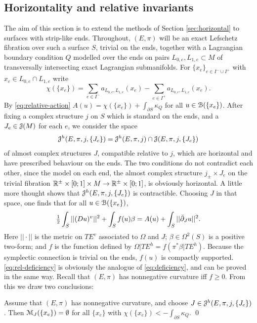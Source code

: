 \documentclass[10pt,letterpaper]{article}
\begin{document}
%

\subsection{Horizontality and relative invariants\label{sec:horizontal-two}}

The aim of this section is to extend the methods of Section
\ref{sec:horizontal} to surfaces with strip-like ends. Throughout, $(E,\pi)$
will be an exact Lefschetz fibration over such a surface $S$, trivial on the
ends, together with a Lagrangian boundary condition $Q$ modelled over the ends
on pairs $L_{0,e},L_{1,e} \subset M$ of transversally intersecting exact
Lagrangian submanifolds. For $\{x_e\}_{e \in I^- \cup I^+}$ with $x_e \in
L_{0,e} \cap L_{1,e}$ write
\[
\chi(\{x_e\}) = \sum_{e \in I^-} a_{L_{0,e},L_{1,e}}(x_e) - \sum_{e \in I^+}
a_{L_{0,e},L_{1,e}}(x_e).
\]
By \eqref{eq:relative-action} $A(u) = \chi(\{x_e\}) + \int_{\partial S}
\kappa_Q$ for all $u \in \mathcal{B}(\{x_e\})$. After fixing a complex structure $j$ on
$S$ which is standard on the ends, and a $J_e \in \mathcal{J}(M)$ for each $e$, we
consider the space
\[
\mathcal{J}^h(E,\pi,j,\{J_e\}) = \mathcal{J}^h(E,\pi,j) \cap \mathcal{J}(E,\pi,j,\{J_e\})
\]
of almost complex structures $J$, compatible relative to $j$, which are
horizontal and have prescribed behaviour on the ends. The two conditions do not
contradict each other, since the model on each end, the almost complex
structure $j_{\pm} \times J_e$ on the trivial fibration $\mathbb{R}^{\pm} \times [0;1]
\times M \rightarrow \mathbb{R}^{\pm} \times [0;1]$, is obviously horizontal. A little
more thought shows that $\mathcal{J}^h(E,\pi,j,\{J_e\})$ is contractible. Choosing $J$
in that space, one finds that for all $u \in \mathcal{B}(\{x_e\})$,
\begin{equation} \label{eq:rel-deficiency}
{\textstyle {\textstyle\frac{1}{2}}} \int_S ||(Du)^v||^2 + \int_S f(u)\beta = A(u) + \int_S
||\bar\partial_J u||^2.
\end{equation}
Here $||\cdot||$ is the metric on $TE^v$ associated to $\Omega$ and $J$; $\beta
\in \Omega^2(S)$ is a positive two-form; and $f$ is the function defined by
$\Omega|TE^h = f(\pi^*\beta|TE^h)$. Because the symplectic connection is
trivial on the ends, $f(u)$ is compactly supported. \eqref{eq:rel-deficiency}
is obviously the analogue of \eqref{eq:deficiency}, and can be proved in the
same way. Recall that $(E,\pi)$ has nonnegative curvature iff $f \geq 0$. From
this we draw two conclusions:

\begin{lemma} \label{th:empty}
Assume that $(E,\pi)$ has nonnegative curvature, and choose $J \in
\mathcal{J}^h(E,\pi,j,\{J_e\})$. Then $\mathcal{M}_J(\{x_e\}) = \emptyset$ for all $\{x_e\}$
with $\chi(\{x_e\}) < -\int_{\partial S} \kappa_Q$. \qed
\end{lemma} \vspace{\parskip}
\end{document}
